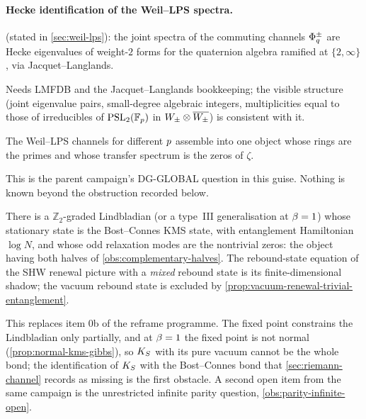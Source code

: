 \paragraph{Hecke identification of the Weil--LPS spectra.} 
(stated in \cref{sec:weil-lps}): the joint spectra of the commuting channels
$\Phi_{q}^{\pm}$ are Hecke eigenvalues of weight-$2$ forms for the quaternion algebra
ramified at $\{2,\infty\}$, via Jacquet--Langlands.

Needs LMFDB and the Jacquet--Langlands bookkeeping; the visible structure
(joint eigenvalue pairs, small-degree algebraic integers, multiplicities equal
to those of irreducibles of $\mathrm{PSL}_2(\mathbb F_p)$ in $W_{\pm}\otimes\overline{W_{\pm}}$)
is consistent with it.

\begin{conjecture}
\label{conj:assemble-over-p}
The Weil--LPS channels for different $p$ assemble into one object whose rings
are the primes and whose transfer spectrum is the zeros of $\zeta$.
\end{conjecture}

This is the parent campaign's DG-GLOBAL question in this guise. Nothing is
known beyond the obstruction recorded below.

\begin{conjecture}
\label{conj:phantasm-both-halves}
There is a $\mathbb Z_2$-graded Lindbladian (or a type~III generalisation at
$\beta=1$) whose stationary state is the Bost--Connes KMS state, with entanglement
Hamiltonian $\log N$, and whose odd relaxation modes are the nontrivial zeros: the object
having both halves of \cref{obs:complementary-halves}. The rebound-state equation of the
SHW renewal picture with a \emph{mixed} rebound state is its finite-dimensional shadow;
the vacuum rebound state is excluded by \cref{prop:vacuum-renewal-trivial-entanglement}.
\end{conjecture}

This replaces item 0b of the reframe programme. The fixed point constrains the Lindbladian
only partially, and at $\beta=1$ the fixed point is not normal
(\cref{prop:normal-kms-gibbs}), so $K_S$ with its pure vacuum cannot be the whole bond; the
identification of $K_S$ with the Bost--Connes bond that \cref{sec:riemann-channel} records
as missing is the first obstacle. A second open item from the same campaign is the
unrestricted infinite parity question, \cref{obs:parity-infinite-open}.

